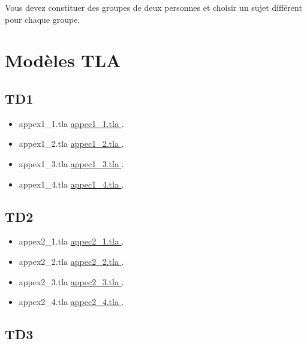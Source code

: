 \documentclass[ 12pt]{article}
\begin{document}
\begin{tcolorbox}
Vous devez  constituer des groupes de deux personnes   et choisir un
sujet  différent pour chaque groupe.




  \section{Modèles TLA}
\label{sec:event-b-models}


\subsection{TD1}

 \begin{itemize}
  \item[]   appex1\_1.tla 
    \href{http://mery54.github.io/teaching/mvsi/models/appex1_1.tla}{
      appec1\_1.tla }.
      \item[]   appex1\_2.tla 
    \href{http://mery54.github.io/teaching/mvsi/models/appex1_2.tla}{
      appec1\_2.tla }.
       \item[]   appex1\_3.tla 
    \href{http://mery54.github.io/teaching/mvsi/models/appex1_3.tla}{
      appec1\_3.tla }.
          \item[]   appex1\_4.tla 
    \href{http://mery54.github.io/teaching/mvsi/models/appex1_4.tla}{
      appec1\_4.tla }.
  \end{itemize}

  
\subsection{TD2}
    
 \begin{itemize}
  \item[]   appex2\_1.tla 
    \href{http://mery54.github.io/teaching/mvsi/models/appex2_1.tla}{
      appec2\_1.tla }.
      \item[]   appex2\_2.tla 
    \href{http://mery54.github.io/teaching/mvsi/models/appex2_2.tla}{
      appec2\_2.tla }.
       \item[]   appex2\_3.tla 
    \href{http://mery54.github.io/teaching/mvsi/models/appex2_3.tla}{
      appec2\_3.tla }.
          \item[]   appex2\_4.tla 
    \href{http://mery54.github.io/teaching/mvsi/models/appex2_4.tla}{
      appec2\_4.tla }.
  \end{itemize}

  
\subsection{TD3}
    

\end{tcolorbox}
\end{document}
